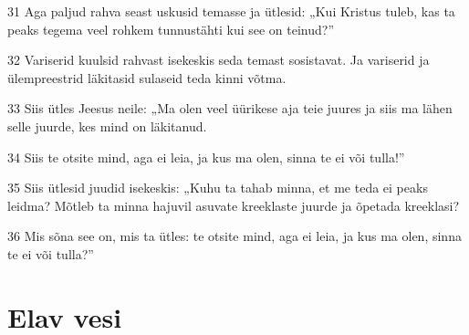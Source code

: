 \par 31 Aga paljud rahva seast uskusid temasse ja ütlesid: „Kui Kristus tuleb, kas ta peaks tegema veel rohkem tunnustähti kui see on teinud?”
\par 32 Variserid kuulsid rahvast isekeskis seda temast sosistavat. Ja variserid ja ülempreestrid läkitasid sulaseid teda kinni võtma.
\par 33 Siis ütles Jeesus neile: „Ma olen veel üürikese aja teie juures ja siis ma lähen selle juurde, kes mind on läkitanud.
\par 34 Siis te otsite mind, aga ei leia, ja kus ma olen, sinna te ei või tulla!”
\par 35 Siis ütlesid juudid isekeskis: „Kuhu ta tahab minna, et me teda ei peaks leidma? Mõtleb ta minna hajuvil asuvate kreeklaste juurde ja õpetada kreeklasi?
\par 36 Mis sõna see on, mis ta ütles: te otsite mind, aga ei leia, ja kus ma olen, sinna te ei või tulla?”

\section*{Elav vesi}

